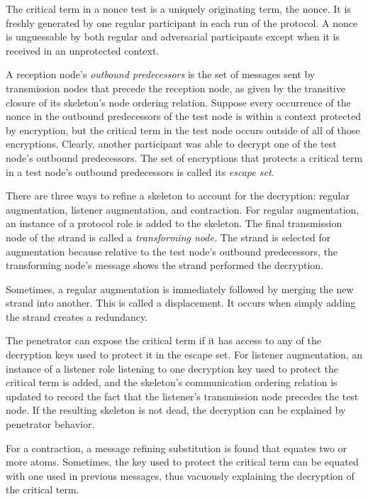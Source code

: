\documentclass[12pt]{article}
\begin{document}
The critical term in a nonce test is a uniquely originating term, the
nonce.  It is freshly generated by one regular participant in each run
of the protocol.  A nonce is unguessable by both regular and
adversarial participants except when it is received in an unprotected
context.

A reception node's \emph{outbound
  predecessors} is the set of messages sent by transmission nodes that
precede the reception node, as given by the transitive closure of its
skeleton's node ordering relation.  Suppose every occurrence of the
nonce in the outbound predecessors of the test node is within a
context protected by encryption, but the critical term in the test
node occurs outside of all of those encryptions.  Clearly, another
participant was able to decrypt one of the test node's outbound
predecessors.  The set of encryptions that protects a critical term
in a test node's outbound predecessors is called its \emph{escape set.}

There are three ways to refine a skeleton to account for the
decryption: regular augmentation, listener augmentation, and
contraction.  For regular augmentation, an instance of a protocol role
is added to the skeleton.  The final transmission node of the strand
is called a \emph{transforming node.}  The strand is selected for
augmentation because relative to the test node's outbound
predecessors, the transforming node's message shows the strand
performed the decryption.

Sometimes, a regular augmentation is immediately followed by merging
the new strand into another.  This is called a displacement.  It
occurs when simply adding the strand creates a redundancy.

The penetrator can expose the critical term if it has access to any
of the decryption keys used to protect it in the escape set.  For
listener augmentation, an instance of a listener role listening to one
decryption key used to protect the critical term is added, and the
skeleton's communication ordering relation is updated to record the
fact that the listener's transmission node precedes the test node.  If
the resulting skeleton is not dead, the decryption can be explained by
penetrator behavior.

For a contraction, a message refining substitution is found that
equates two or more atoms.  Sometimes, the key used to protect the
critical term can be equated with one used in previous messages,
thus vacuously explaining the decryption of the critical term.
\end{document}
